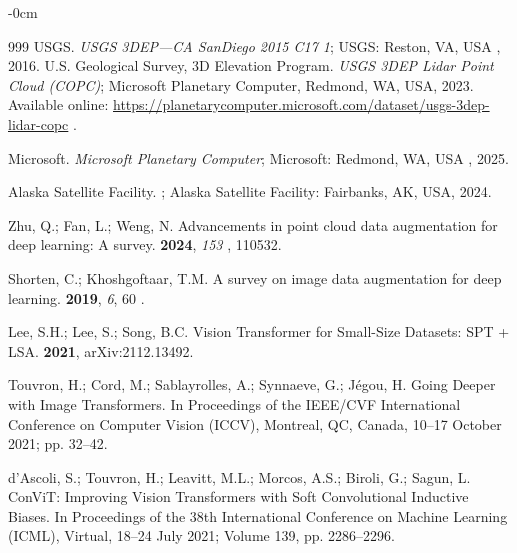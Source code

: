 \documentclass[remotesensing,article,accept,pdftex,moreauthors]{Definitions/mdpi}
\begin{document}
\begin{adjustwidth}{-\extralength}{0cm}
\begin{thebibliography}{999}
{USGS}.
\newblock \emph{{USGS} 3DEP---{CA} {SanDiego} 2015 C17 1}; USGS: Reston, VA, USA
, 2016.
{U.S. Geological Survey, 3D Elevation Program}.
\newblock \emph{USGS 3DEP Lidar Point Cloud (COPC)};
\newblock Microsoft Planetary Computer, Redmond, WA, USA, 2023. Available online: \url{https://planetarycomputer.microsoft.com/dataset/usgs-3dep-lidar-copc}
.

Microsoft.
\newblock \emph{Microsoft {Planetary} {Computer}}; Microsoft: Redmond, WA, USA
, 2025.

{Alaska Satellite Facility}.
; Alaska Satellite Facility: Fairbanks, AK, USA, 2024.

Zhu, Q.; Fan, L.; Weng, N.
\newblock Advancements in point cloud data augmentation for deep learning: A
  survey.
 {\bf 2024}, \emph{153
}, 110532.

Shorten, C.; Khoshgoftaar, T.M.
\newblock A survey on image data augmentation for deep learning.
 {\bf 2019}, {\em 6}, 60
.

Lee, S.H.; Lee, S.; Song, B.C.
\newblock Vision Transformer for Small-Size Datasets: {SPT + LSA}.
 {\bf 2021}, arXiv:2112.13492.

Touvron, H.; Cord, M.; Sablayrolles, A.; Synnaeve, G.; J{\'e}gou, H.
\newblock Going Deeper with Image Transformers.
\newblock In Proceedings of the IEEE/CVF International
  Conference on Computer Vision (ICCV), Montreal, QC, Canada, 10--17 October 2021; pp. 32--42.

d'Ascoli, S.; Touvron, H.; Leavitt, M.L.; Morcos, A.S.; Biroli, G.; Sagun, L.
\newblock ConViT: Improving Vision Transformers with Soft Convolutional
  Inductive Biases.
\newblock In Proceedings of the 38th International
  Conference on Machine Learning (ICML), Virtual, 18--24 July 2021; Volume 139, pp. 2286--2296.


\end{thebibliography}
\end{adjustwidth}
\end{document}

